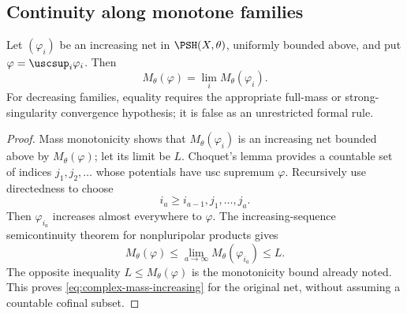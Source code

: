 \subsection{Continuity along monotone families}
\label{sec:ch51-mass-continuity}

\begin{proposition}\label{prop:complex-mass-continuity}
Let \((\varphi_i)\) be an increasing net in \(\PSH(X,\theta)\), uniformly
bounded above, and put
\(\varphi=\uscsup_i\varphi_i\).  Then
\[
                   M_\theta(\varphi)=\lim_iM_\theta(\varphi_i).
\tag{51.19}\label{eq:complex-mass-increasing}
\]
For decreasing families, equality requires the appropriate
full-mass or strong-singularity convergence hypothesis; it is false as
an unrestricted formal rule.
\end{proposition}

\begin{proof}
Mass monotonicity shows that \(M_\theta(\varphi_i)\) is an increasing
net bounded above by \(M_\theta(\varphi)\); let its limit be \(L\).
Choquet's lemma provides a countable set of indices \(j_1,j_2,\ldots\)
whose potentials have usc supremum \(\varphi\).  Recursively use
directedness to choose
\[
 i_a\geq i_{a-1},j_1,\ldots,j_a .
\]
Then \(\varphi_{i_a}\) increases almost everywhere to \(\varphi\).
The increasing-sequence semicontinuity theorem for nonpluripolar
products gives
\[
 M_\theta(\varphi)
 \leq\lim_{a\to\infty}M_\theta(\varphi_{i_a})
 \leq L.
\]
The opposite inequality \(L\leq M_\theta(\varphi)\) is the monotonicity
bound already noted.  This proves \eqref{eq:complex-mass-increasing}
for the original net, without assuming a countable cofinal subset.
\end{proof}

